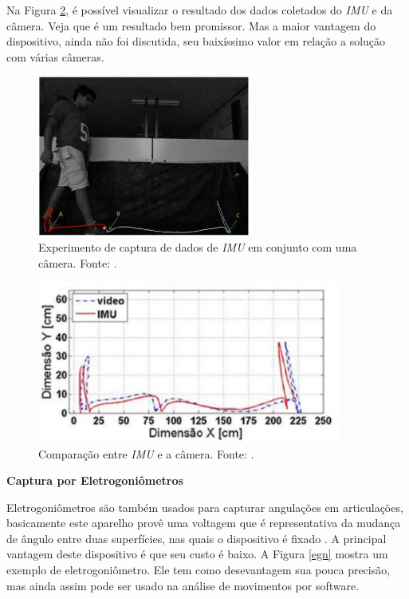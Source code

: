 Na Figura \ref{imu2}, é possível visualizar o resultado dos dados coletados do \emph{IMU} e da câmera. 
Veja que é um resultado bem promissor. 
Mas a maior vantagem do dispositivo, ainda não foi discutida, seu baixíssimo valor em relação a solução com várias câmeras.

\begin{figure}[H]
	\centering
	\includegraphics[width=7cm]{figuras/imu.eps}
	\caption{Experimento de captura de dados de \emph{IMU} em conjunto com uma câmera. Fonte: .}
	\label{imu}
	
\end{figure}


\begin{figure}[H]
	\centering
	\includegraphics[width=10cm]{figuras/imu2.eps}
	\caption{Comparação entre \emph{IMU} e a câmera. Fonte: .}
	\label{imu2}
	
\end{figure}



\textbf{Captura por Eletrogoniômetros}

\noindent
Eletrogoniômetros são também usados para capturar angulações em articulações, basicamente este aparelho provê uma voltagem que é representativa da mudança de ângulo entre duas superfícies, nas quais o dispositivo é fixado \cite{K.Ibrahim2012}. 
A principal vantagem deste dispositivo é que seu custo é baixo. A Figura \ref{egn} mostra um exemplo de eletrogoniômetro.
Ele tem como desevantagem sua pouca precisão, mas ainda assim pode ser usado na análise de movimentos por software.



